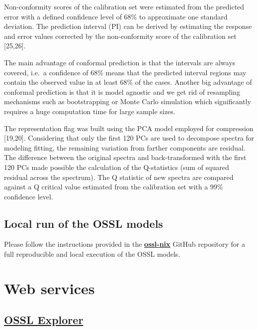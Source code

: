 \documentclass[
  letterpaper,
  DIV=11,
  numbers=noendperiod]{scrreprt}
\begin{document}
Non-conformity scores of the calibration set were estimated from the
predicted error with a defined confidence level of 68\% to approximate
one standard deviation. The prediction interval (PI) can be derived by
estimating the response and error values corrected by the non-conformity
score of the calibration set {[}25,26{]}.

The main advantage of conformal prediction is that the intervals are
always covered, i.e.~a confidence of 68\% means that the predicted
interval regions may contain the observed value in at least 68\% of the
cases. Another big advantage of conformal prediction is that it is model
agnostic and we get rid of resampling mechanisms such as bootstrapping
or Monte Carlo simulation which significantly requires a huge
computation time for large sample sizes.

The representation flag was built using the PCA model employed for
compression {[}19,20{]}. Considering that only the first 120 PCs are
used to decompose spectra for modeling fitting, the remaining variation
from farther components are residual. The difference between the
original spectra and back-transformed with the first 120 PCs made
possible the calculation of the Q-statistics (sum of squared residual
across the spectrum). The Q statistic of new spectra are compared
against a Q critical value estimated from the calibration set with a
99\% confidence level.

\section{Local run of the OSSL
models}\label{local-run-of-the-ossl-models}

Please follow the instructions provided in the
\href{https://github.com/soilspectroscopy/ossl-nix}{\textbf{ossl-nix}}
GitHub repository for a full reproducible and local execution of the
OSSL models.


\chapter{Web services}\label{sec-web-services}

\section{\texorpdfstring{\href{https://explorer.soilspectroscopy.org/}{OSSL
Explorer}}{OSSL Explorer}}\label{ossl-explorer}
\end{document}
